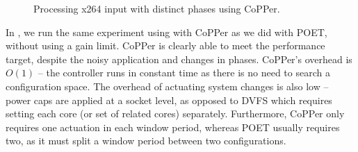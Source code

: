 \begin{figure}[t]
  
  \caption{Processing x264 input with distinct phases using CoPPer.}
  \label{fig:copper-phases-x264}
\end{figure}

In , we run the same experiment using  with CoPPer as we did with POET, without using a gain limit.
CoPPer is clearly able to meet the performance target, despite the noisy application and changes in phases.
CoPPer's overhead is $O(1)$ -- the controller runs in constant time as there is no need to search a configuration space.
The overhead of actuating system changes is also low -- power caps are applied at a socket level, as opposed to DVFS which requires setting each core (or set of related cores) separately.
Furthermore, CoPPer only requires one actuation in each window period, whereas POET usually requires two, as it must split a window period between two configurations.
